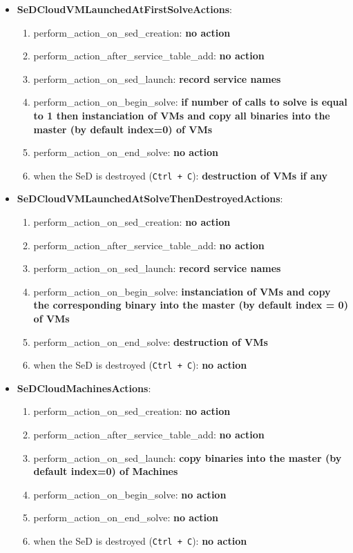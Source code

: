 \begin{itemize}
  \item \textbf{SeDCloudVMLaunchedAtFirstSolveActions}:
    \begin{enumerate}
        \item perform\_action\_on\_sed\_creation: \textbf{no action}
        \item perform\_action\_after\_service\_table\_add: \textbf{no action}
        \item perform\_action\_on\_sed\_launch: \textbf{record service names}
        \item perform\_action\_on\_begin\_solve: \textbf{if number of calls to solve is equal to 1 then instanciation of VMs and copy all binaries into the master (by default index=0) of VMs}
        \item perform\_action\_on\_end\_solve: \textbf{no action}
        \item when the SeD is destroyed (\texttt{Ctrl + C}): \textbf{destruction of VMs if any}
      \end{enumerate}
  \item \textbf{SeDCloudVMLaunchedAtSolveThenDestroyedActions}:
    \begin{enumerate}
        \item perform\_action\_on\_sed\_creation: \textbf{no action}
        \item perform\_action\_after\_service\_table\_add: \textbf{no action}
        \item perform\_action\_on\_sed\_launch: \textbf{record service names}
        \item perform\_action\_on\_begin\_solve: \textbf{instanciation of VMs and copy the corresponding binary into the master (by default index = 0) of VMs}
        \item perform\_action\_on\_end\_solve: \textbf{destruction of VMs}
        \item when the SeD is destroyed (\texttt{Ctrl + C}): \textbf{no action}
      \end{enumerate}
  \item \textbf{SeDCloudMachinesActions}:
    \begin{enumerate}
        \item perform\_action\_on\_sed\_creation: \textbf{no action}
        \item perform\_action\_after\_service\_table\_add: \textbf{no action}
        \item perform\_action\_on\_sed\_launch: \textbf{copy binaries into the master (by default index=0) of Machines}
        \item perform\_action\_on\_begin\_solve: \textbf{no action}
        \item perform\_action\_on\_end\_solve: \textbf{no action}
        \item when the SeD is destroyed (\texttt{Ctrl + C}): \textbf{no action}
   \end{enumerate}


\end{itemize}

